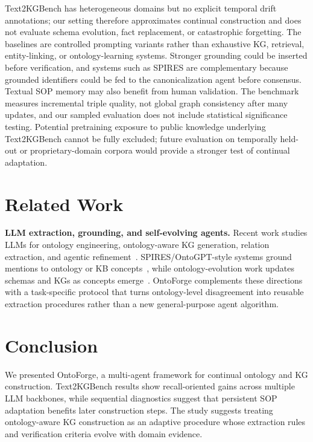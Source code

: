 \documentclass[sigconf]{acmart}
\begin{document}
Text2KGBench has heterogeneous domains but no explicit temporal drift annotations; our setting therefore approximates continual construction and does not evaluate schema evolution, fact replacement, or catastrophic forgetting. The baselines are controlled prompting variants rather than exhaustive KG, retrieval, entity-linking, or ontology-learning systems. Stronger grounding could be inserted before verification, and systems such as SPIRES are complementary because grounded identifiers could be fed to the canonicalization agent before consensus. Textual SOP memory may also benefit from human validation. The benchmark measures incremental triple quality, not global graph consistency after many updates, and our sampled evaluation does not include statistical significance testing.
Potential pretraining exposure to public knowledge underlying Text2KGBench cannot be fully excluded; future evaluation on temporally held-out or proprietary-domain corpora would provide a stronger test of continual adaptation.

\section{Related Work}
\label{sec:related}

\textbf{LLM extraction, grounding, and self-evolving agents.}
Recent work studies LLMs for ontology engineering, ontology-aware KG generation, relation extraction, and agentic refinement~\cite{ontologyllm2023,llms4ol2023,ontochat2024,text2kgbench2023,wan2023gptre,wadhwa2023revisiting,swarup2025llm4re,tran2025llmasp,yao2023react,shinn2023reflexion,autogen2023,metagpt2023}. SPIRES/OntoGPT-style systems ground mentions to ontology or KB concepts~\cite{ontogpt2023}, while ontology-evolution work updates schemas and KGs as concepts emerge~\cite{flouris2008ontology,dou2015ontology}. OntoForge complements these directions with a task-specific protocol that turns ontology-level disagreement into reusable extraction procedures rather than a new general-purpose agent algorithm.

\section{Conclusion}

We presented OntoForge, a multi-agent framework for continual ontology and KG construction. Text2KGBench results show recall-oriented gains across multiple LLM backbones, while sequential diagnostics suggest that persistent SOP adaptation benefits later construction steps. The study suggests treating ontology-aware KG construction as an adaptive procedure whose extraction rules and verification criteria evolve with domain evidence.
\end{document}
